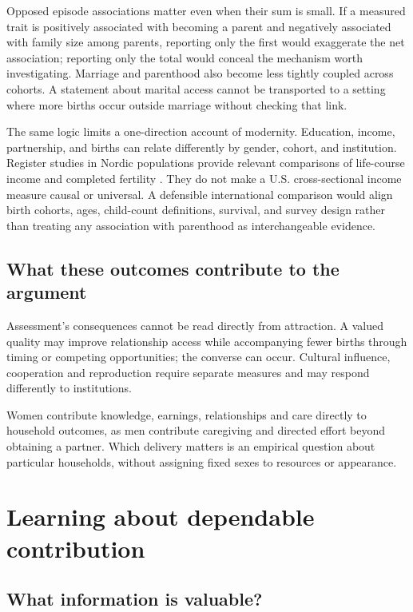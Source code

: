Opposed episode associations matter even when their sum is small. If a measured trait is positively associated with becoming a parent and negatively associated with family size among parents, reporting only the first would exaggerate the net association; reporting only the total would conceal the mechanism worth investigating. Marriage and parenthood also become less tightly coupled across cohorts. A statement about marital access cannot be transported to a setting where more births occur outside marriage without checking that link.

The same logic limits a one-direction account of modernity. Education, income, partnership, and births can relate differently by gender, cohort, and institution. Register studies in Nordic populations provide relevant comparisons of life-course income and completed fertility \citep{kolk2023,jalovaara2019}. They do not make a U.S. cross-sectional income measure causal or universal. A defensible international comparison would align birth cohorts, ages, child-count definitions, survival, and survey design rather than treating any association with parenthood as interchangeable evidence.

\subsection{What these outcomes contribute to the argument}

Assessment's consequences cannot be read directly from attraction. A valued quality may improve relationship access while accompanying fewer births through timing or competing opportunities; the converse can occur. Cultural influence, cooperation and reproduction require separate measures and may respond differently to institutions.

Women contribute knowledge, earnings, relationships and care directly to household outcomes, as men contribute caregiving and directed effort beyond obtaining a partner. Which delivery matters is an empirical question about particular households, without assigning fixed sexes to resources or appearance.

\section{Learning about dependable contribution}\label{sec:minds-learning}

\subsection{What information is valuable?}

